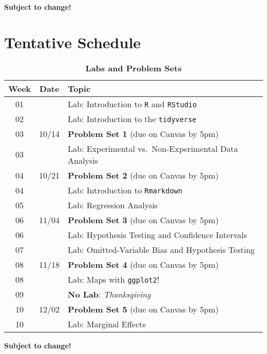 \documentclass[10pt]{article}
\newcommand{\ra}[1]{\renewcommand{\arraystretch}{#1}}
\begin{document}
\begin{center}
	\textbf{Subject to change!}
\end{center}

\newpage
\section*{Tentative Schedule}

\begin{table}[H]
	\caption*{\large\textbf{Labs and Problem Sets}}
	\centering
	\ra{1.5}
	\begin{tabular}{@{\extracolsep{0.5cm}} c c l @{}}
		\toprule
		\textbf{Week} & \textbf{Date} & \textbf{Topic}  \\ \toprule
		01 &  & Lab: Introduction to \texttt{R} and \texttt{RStudio} \\
		02 &  & Lab: Introduction to the \texttt{tidyverse} \\ 
		03 & 10/14 & \textbf{Problem Set 1} (due on Canvas by 5pm)  \\ \midrule
		03 &  & Lab: Experimental vs.\ Non-Experimental Data Analysis \\ 
		04 & 10/21 & \textbf{Problem Set 2} (due on Canvas by 5pm)  \\ \midrule
		04 &  & Lab: Introduction to \texttt{Rmarkdown} \\ 
		05 &  & Lab: Regression Analysis \\ 
		06 & 11/04 & \textbf{Problem Set 3} (due on Canvas by 5pm) \\ \midrule
		06 &  & Lab: Hypothesis Testing and Confidence Intervals \\
		07 &  & Lab: Omitted-Variable Bias and Hypothesis Testing \\ 
		08 & 11/18 & \textbf{Problem Set 4} (due on Canvas by 5pm)  \\ \midrule
		08 &  & Lab: Maps with \texttt{ggplot2}! \\
		09 &  & \textbf{No Lab}: \textit{Thanksgiving} \\ 
		10 & 12/02 & \textbf{Problem Set 5} (due on Canvas by 5pm) \\ \midrule
		10 &  & Lab: Marginal Effects \\ \bottomrule
	\end{tabular}
\end{table}

\begin{center}
	\textbf{Subject to change!}
\end{center}
\end{document}
